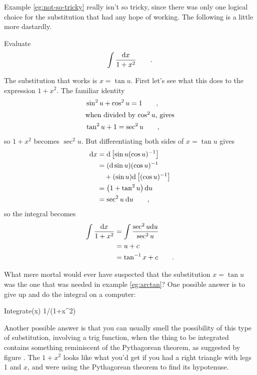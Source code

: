 Example \ref{eg:not-so-tricky} really isn't so tricky, since there was only one logical
choice for the substitution that had any hope of working. The following is a little more
dastardly.

\begin{eg}\label{eg:arctan}
\egquestion Evaluate
\begin{equation*}
  \int \frac{\textup{d} x}{1+x^2} \qquad .
\end{equation*}

\eganswer The substitution that works is $x=\tan u$. First let's see what this does
to the expression $1+x^2$. The familiar identity
\begin{align*}
   &\sin^2 u + \cos^2 u = 1 \qquad ,\\
\intertext{when divided by $\cos^2 u$, gives}
   &\tan^2 u + 1 = \sec^2 u \qquad ,
\end{align*}
so $1+x^2$ becomes $\sec^2 u$.
But differentiating both sides of $x=\tan u$ gives
\begin{align*}
  \textup{d} x &= \textup{d} \left[\sin u(\cos u)^{-1}\right] \\
         &= (\textup{d}\sin u)(\cos u)^{-1}\\
         &  \quad +(\sin u)\textup{d}\left[(\cos u)^{-1}\right] \\
         &= \left(1+\tan^2 u\right)\textup{d} u \\
         &= \sec^2 u\:\textup{d} u \qquad , 
\end{align*}
so the integral becomes
\begin{align*}
  \int \frac{\textup{d} x}{1+x^2} &= \int \frac{\sec^2 u \textup{d} u}{\sec^2 u} \\
           &= u+c \\
           &= \tan^{-1} x+c \qquad .
\end{align*}
\end{eg}
%
What mere mortal would ever have suspected that the substitution $x=\tan u$ was
the one that was needed in example \ref{eg:arctan}? One possible answer is to
give up and do the integral on a computer:

\begin{Code}
  \ii Integrate(x) 1/(1+x^2)
\end{Code}

Another possible answer is that you can usually smell the possibility of
this type of substitution, involving a trig function, when the thing to be
integrated contains something reminiscent of the Pythagorean theorem, as
suggested by figure . The $1+x^2$ looks like what
you'd get if you had a right triangle with legs 1 and $x$, and were using the
Pythagorean theorem to find its hypotenuse.
%

